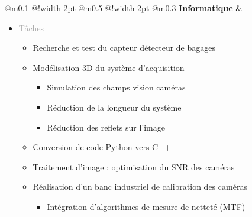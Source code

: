 \documentclass{article}
\begin{document}
\begin{tabular}
    {
        @{}m{}
        @{\hspace{0.001\textwidth}}!{\color{secondaryBlue}\vline width 2pt} %
        @{}m{0.5\textwidth}
        @{\hspace{0.025\textwidth}}!{\color{secondaryBlue}\vline width 2pt} %
        @{{\hspace{0.001\textwidth}}}m{0.3\textwidth}
    }
    \textcolor{secondaryBlue}
    {
        \textbf{Informatique}
    }           
    &
    \begin{itemize}
        [label={}, topsep=8pt, partopsep=0pt, itemsep=0.5pt, parsep=2pt,after=\vspace*{-\baselineskip}]
        \setlength{\itemsep}{10pt} 

        \item \textcolor{darkGray}{Tâches} 
        \begin{itemize}
        [label={\textcolor{gray!80}{\checkmark}}, topsep=8pt, partopsep=0pt, itemsep=0.5pt, parsep=2pt] 
            \item \textcolor{gray!80}{Recherche et test du capteur détecteur de bagages}
            \item \textcolor{gray!80}{Modélisation 3D du système d'acquisition}
            \begin{itemize}
                [label={\textcolor{gray!80}{$\triangleright$}}, topsep=0pt, partopsep=0pt, itemsep=0.5pt, parsep=2pt]
                \item \textcolor{gray!80}{Simulation des champs vision caméras}
                \item \textcolor{gray!80}{Réduction de la longueur du système}
                \item \textcolor{gray!80}{Réduction des reflets sur l'image}
            \end{itemize}
            \item \textcolor{gray!80}{Conversion de code Python vers C++}
            \item \textcolor{gray!80}{Traitement d'image : optimisation du SNR des caméras}
            \item \textcolor{gray!80}{Réalisation d'un banc industriel de calibration des caméras}
            \begin{itemize}
            [label={\textcolor{gray!80}{$\triangleright$}}, topsep=0pt, partopsep=0pt, itemsep=0.5pt, parsep=2pt]   
                \item \textcolor{gray!80}{Intégration d'algorithmes de mesure de netteté (MTF) }

\end{itemize}
\end{itemize}
\end{itemize}
\end{tabular}
\end{document}
